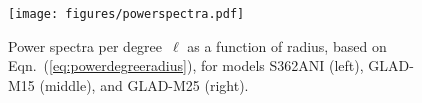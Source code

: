 \documentclass[extra,mreferee]{gji}
\begin{document}
\begin{figure}
  \centering
  \texttt{[image: figures/powerspectra.pdf]}
  \caption{\small{Power spectra per degree~$\ell$ as a function of radius, based on Eqn.~(\ref{eq:powerdegreeradius}), for models S362ANI (left), GLAD-M15 (middle), and GLAD-M25 (right).}}
  \label{fig:powerspectra}
\end{figure}





\end{document}
